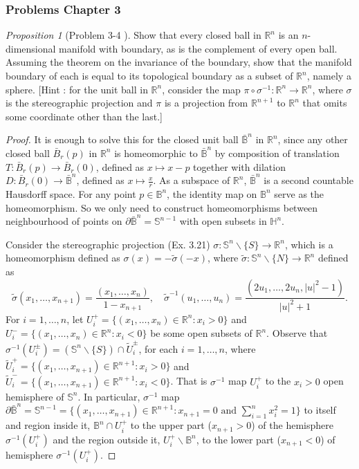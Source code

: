 \documentclass[a4paper]{article}
\theoremstyle{remark}
\newtheorem{prop}{Proposition}
\newcommand{\er}{\mathbb{R}} %
\newcommand{\rn}{\mathbb{R}^n} %
\newcommand{\hn}{\mathbb{H}^n} %
\newcommand{\s}{\mathbb{S}} %
\newcommand{\openball}{\mathbb{B}} %
\newcommand{\closedball}{\bar{\mathbb{B}}} %
\newcommand{\doo}{\partial}    %
\begin{document}
\subsubsection*{Problems Chapter 3}
\begin{prop}[Problem 3-4 \cite{LeeTM}]
	Show that every closed ball in $\rn$ is an $n$-dimensional manifold with boundary, as is the complement of every open ball. Assuming the theorem on the invariance of the boundary, show that the manifold boundary of each is equal to its topological boundary as a subset of $\rn$, namely a sphere. [Hint : for the unit ball in $\rn$, consider the map $\pi \circ \sigma^{-1} : \rn \to \rn$, where $\sigma$ is the stereographic projection and $\pi$ is a projection from $\er^{n+1}$ to $\rn$ that omits some coordinate other than the last.]
\end{prop}
\begin{proof}
	It is enough to solve this for the closed unit ball $\bar{\mathbb{B}}^n$ in $\rn$, since any other closed ball $\bar{B}_r(p)$ in $\rn$ is homeomorphic to $\bar{\mathbb{B}}^n$ by composition of translation $T : \bar{B}_r(p) \to \bar{B}_r(0)$, defined as $x \mapsto x - p$ together with dilation $D : \bar{B}_r(0) \to \bar{\mathbb{B}}^n$, defined as $x \mapsto \frac{x}{r}$. As a subspace of $\rn$, $\closedball^n$ is a second countable Hausdorff space. For any point $p\in \openball^n$, the identity map on $\openball^n$ serve as the homeomorphism. So we only need to construct homeomorphisms between neighbourhood of points on $\doo \closedball^n=\s^{n-1}$ with open subsets in $\hn$.
	
	Consider the stereographic projection (Ex. 3.21) $\sigma : \s^n\smallsetminus \{S\} \to \rn$, which is a homeomorphism defined as $\sigma(x) = -\tilde{\sigma}(-x)$, where $\tilde{\sigma} : \s^n \smallsetminus \{N\} \to \er^n$ defined as
	$$
	\tilde{\sigma}(x_1,\dots,x_{n+1}) = \frac{(x_1,\dots,x_n)}{1-x_{n+1}}, \quad \tilde{\sigma}^{-1}(u_1,\dots,u_n)= \frac{(2u_1,\dots,2u_n,|u|^2-1)}{|u|^2+1}.
	$$
	For $i=1,\dots,n$, let $U_i^{+} =\{ (x_1,\dots,x_n) \in \rn : x_i > 0 \}$  and $U_i^{-} =\{ (x_1,\dots,x_n) \in \rn : x_i < 0 \}$ be some open subsets of $\rn$. Observe that $\sigma^{-1}(U_i^{\pm}) = (\s^n\smallsetminus\{S\}) \cap \widetilde{U}_i^{\pm}$, for each $i=1,\dots,n$, where $\widetilde{U}_i^+ = \{(x_1,\dots,x_{n+1}) \in \er^{n+1} : x_i>0 \}$ and $\widetilde{U}_i^- = \{(x_1,\dots,x_{n+1}) \in \er^{n+1} : x_i<0 \}$. That is $\sigma^{-1}$ map $U_i^+$ to the $x_i>0$ open hemisphere of $\s^n$. In particular, $\sigma^{-1}$ map $\doo \closedball^n = \s^{n-1} = \{(x_1,\dots,x_{n+1}) \in \er^{n+1} : x_{n+1} = 0 \text{ and }\sum_{i=1}^{n} x_i^2 = 1 \}$ to itself and region inside it, $\openball^n \cap U_i^+$ to the upper part ($x_{n+1}>0$) of the hemisphere $\sigma^{-1}(U_i^+)$ and the region outside it, $U_i^+ \smallsetminus \openball^n$, to the lower part ($x_{n+1}<0$) of hemisphere $\sigma^{-1}(U_i^+)$.     
	

\end{proof}
\end{document}
